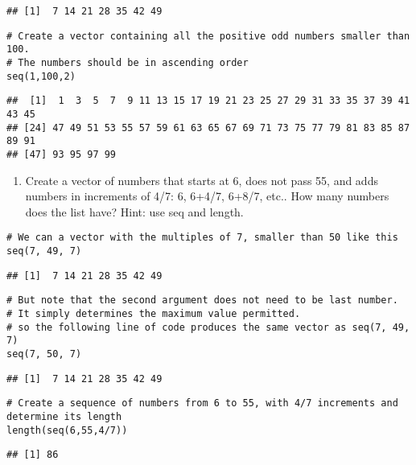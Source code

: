 \documentclass[
]{article}
\providecommand{\tightlist}{%
  \setlength{\itemsep}{0pt}\setlength{\parskip}{0pt}}
\begin{document}
\begin{verbatim}
## [1]  7 14 21 28 35 42 49
\end{verbatim}

\begin{verbatim}
# Create a vector containing all the positive odd numbers smaller than 100.
# The numbers should be in ascending order
seq(1,100,2)
\end{verbatim}

\begin{verbatim}
##  [1]  1  3  5  7  9 11 13 15 17 19 21 23 25 27 29 31 33 35 37 39 41 43 45
## [24] 47 49 51 53 55 57 59 61 63 65 67 69 71 73 75 77 79 81 83 85 87 89 91
## [47] 93 95 97 99
\end{verbatim}

\begin{enumerate}
\def\labelenumi{\arabic{enumi}.}
\setcounter{enumi}{7}
\tightlist
\item
  Create a vector of numbers that starts at 6, does not pass 55, and
  adds numbers in increments of 4/7: 6, 6+4/7, 6+8/7, etc.. How many
  numbers does the list have? Hint: use seq and length.
\end{enumerate}

\begin{verbatim}
# We can a vector with the multiples of 7, smaller than 50 like this 
seq(7, 49, 7) 
\end{verbatim}

\begin{verbatim}
## [1]  7 14 21 28 35 42 49
\end{verbatim}

\begin{verbatim}
# But note that the second argument does not need to be last number.
# It simply determines the maximum value permitted.
# so the following line of code produces the same vector as seq(7, 49, 7)
seq(7, 50, 7)
\end{verbatim}

\begin{verbatim}
## [1]  7 14 21 28 35 42 49
\end{verbatim}

\begin{verbatim}
# Create a sequence of numbers from 6 to 55, with 4/7 increments and determine its length
length(seq(6,55,4/7))
\end{verbatim}

\begin{verbatim}
## [1] 86
\end{verbatim}
\end{document}
